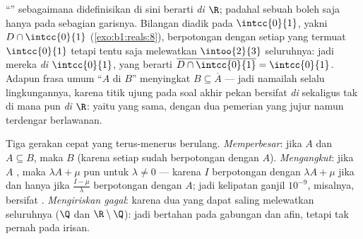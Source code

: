 \begin{example}\label{ex:b1:topology:relativedensity}
``'' sebagaimana didefinisikan di sini berarti  \emph{di $\R$}; padahal sebuah  boleh
saja  hanya pada sebagian garisnya. Bilangan diadik pada
$\intcc{0}{1}$, yakni $D \cap \intcc{0}{1}$
(\cref{exo:b1:reals:8}), berpotongan dengan setiap   yang termuat
$\intcc{0}{1}$ tetapi tentu saja melewatkan $\intoo{2}{3}$ seluruhnya: jadi mereka
 \emph{di} $\intcc{0}{1}$, yang berarti $\overline{D \cap
\intcc{0}{1}} = \intcc{0}{1}$. Adapun frasa umum ``$A$ 
di $B$'' menyingkat $B \subseteq \overline A$ --- jadi namailah selalu
 lingkungannya, karena titik ujung pada soal akhir pekan bersifat 
\emph{di } sekaligus tak  di mana pun \emph{di
$\R$}: yaitu  yang sama, dengan dua pemerian yang jujur namun
terdengar berlawanan.
\end{example}

\begin{example}\label{ex:b1:topology:densitytricks}
Tiga gerakan cepat yang terus-menerus berulang. \emph{Memperbesar}: jika
$A$  dan $A \subseteq B$, maka $B$  (karena setiap
 sudah berpotongan dengan $A$). \emph{Mengangkut}: jika $A$
, maka $\lambda A + \mu$ pun  untuk $\lambda \neq 0$ --- karena
 $I$ berpotongan dengan $\lambda A + \mu$ jika dan hanya jika 
$\frac{I - \mu}{\lambda}$ berpotongan dengan $A$; jadi kelipatan ganjil
$10^{-9}$, misalnya, bersifat . \emph{Mengiriskan gagal}: karena dua 
yang  dapat saling melewatkan seluruhnya ($\Q$ dan $\R \setminus \Q$):
jadi  bertahan pada gabungan dan  afin, tetapi tak pernah pada irisan.
\end{example}

